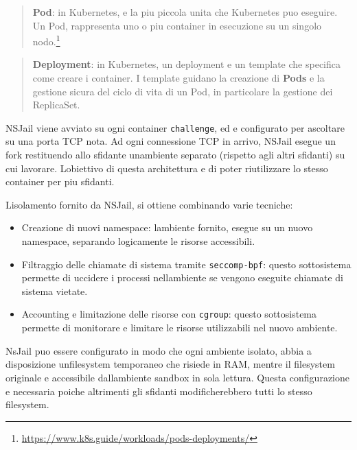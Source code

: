 \begin{quote}
\textbf{Pod}: in Kubernetes, e\textquotesingle{} la piu piccola unita
che Kubernetes puo\textquotesingle{} eseguire. Un Pod, rappresenta uno o
piu container in esecuzione su un singolo nodo.\footnote{\label{fn:ref_7}\url{https://www.k8s.guide/workloads/pods-deployments/}}
\end{quote}

\begin{quote}
\textbf{Deployment}: in Kubernetes, un deployment e\textquotesingle{} un
template che specifica come creare i container. I template guidano la
creazione di \textbf{Pods} e la gestione sicura del ciclo di vita di un
Pod, in particolare la gestione dei ReplicaSet.
\end{quote}

NSJail viene avviato su ogni container
\passthrough{\lstinline!challenge!}, ed e\textquotesingle{} configurato
per ascoltare su una porta TCP nota. Ad ogni connessione TCP in arrivo,
NSJail esegue un fork restituendo allo sfidante
un\textquotesingle ambiente separato (rispetto agli altri sfidanti) su
cui lavorare. L\textquotesingle obiettivo di questa architettura
e\textquotesingle{} di poter riutilizzare lo stesso container per piu
sfidanti.

L\textquotesingle isolamento fornito da NSJail, si ottiene combinando
varie tecniche:

\begin{itemize}
\tightlist
\item
  Creazione di nuovi namespace: l\textquotesingle ambiente fornito,
  esegue su un nuovo namespace, separando logicamente le risorse
  accessibili.
\item
  Filtraggio delle chiamate di sistema tramite
  \passthrough{\lstinline!seccomp-bpf!}: questo sottosistema permette di
  uccidere i processi nell\textquotesingle ambiente se vengono eseguite
  chiamate di sistema vietate.
\item
  Accounting e limitazione delle risorse con
  \passthrough{\lstinline!cgroup!}: questo sottosistema permette di
  monitorare e limitare le risorse utilizzabili nel nuovo ambiente.
\end{itemize}

NsJail puo\textquotesingle{} essere configurato in modo che ogni
ambiente isolato, abbia a disposizione un\textquotesingle filesystem
temporaneo che risiede in RAM, mentre il filesystem originale
e\textquotesingle{} accessibile dall\textquotesingle ambiente sandbox in
sola lettura. Questa configurazione e\textquotesingle{} necessaria
poiche altrimenti gli sfidanti modificherebbero tutti lo stesso
filesystem.

